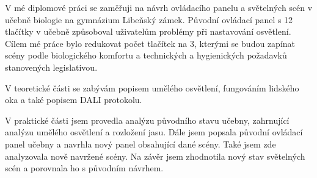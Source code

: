 \medskip
V mé diplomové práci se zaměřuji na návrh ovládacího panelu a světelných scén v učebně biologie na gymnázium Libeňský zámek. Původní ovládací panel s 12 tlačítky v učebně způsoboval uživatelům problémy při nastavování osvětlení. Cílem mé práce bylo redukovat počet tlačítek na 3, kterými se budou zapínat scény podle biologického komfortu a technických a hygienických požadavků stanovených legislativou.

\medskip
V teoretické části se zabývám popisem umělého osvětlení, fungováním lidského oka a také popisem DALI protokolu.

\medskip
V praktické části jsem provedla analýzu původního stavu učebny, zahrnující analýzu umělého osvětlení a rozložení jasu. Dále jsem popsala původní ovládací panel učebny a navrhla nový panel obsahující dané scény. Také jsem zde analyzovala nově navržené scény. Na závěr jsem zhodnotila nový stav světelných scén a porovnala ho s původním návrhem.





